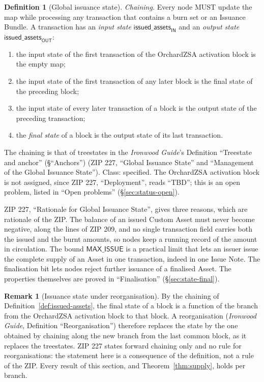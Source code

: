 \documentclass[11pt,a4paper]{article}
\theoremstyle{definition}
\newtheorem{definition}[theorem]{Definition}
\newtheorem{remark}[theorem]{Remark}
\begin{document}
\begin{definition}[Global issuance state]
\emph{Chaining.} Every node MUST update the map while processing any
transaction that contains a burn set or an Issuance Bundle. A transaction has
an \emph{input state} $\mathsf{issued\_assets}_{\mathsf{IN}}$ and an
\emph{output state} $\mathsf{issued\_assets}_{\mathsf{OUT}}$:
\begin{enumerate}
\item the input state of the first transaction of the OrchardZSA activation
  block is the empty map;
\item the input state of the first transaction of any later block is the
  final state of the preceding block;
\item the input state of every later transaction of a block is the output
  state of the preceding transaction;
\item the \emph{final state} of a block is the output state of its last
  transaction.
\end{enumerate}
The chaining is that of treestates in the \emph{Ironwood Guide}'s
Definition ``Treestate and anchor'' (\S``Anchors'') (ZIP 227, ``Global
Issuance State'' and ``Management of the Global Issuance State''). Class:
specified. The OrchardZSA activation block is not assigned, since ZIP 227,
``Deployment'', reads ``TBD''; this is an open problem, listed in ``Open
problems'' (\S\ref{sec:status-open}).
\end{definition}

ZIP 227, ``Rationale for Global Issuance State'', gives three reasons, which
are rationale of the ZIP. The balance of an issued Custom Asset must never
become negative, along the lines of ZIP 209, and no single transaction field
carries both the issued and the burnt amounts, so nodes keep a running record
of the amount in circulation. The bound $\mathsf{MAX\_ISSUE}$ is a practical
limit that lets an issuer issue the complete supply of an Asset in one
transaction, indeed in one Issue Note. The finalisation bit lets nodes reject
further issuance of a finalised Asset. The properties themselves are proved
in ``Finalisation'' (\S\ref{sec:state-final}).

\begin{remark}[Issuance state under reorganisation]\label{rem:reorg-state}
By the chaining of Definition~\ref{def:issued-assets}, the final state of a
block is a function of the branch from the OrchardZSA activation block to
that block. A reorganisation (\emph{Ironwood Guide}, Definition
``Reorganisation'') therefore replaces the state by the one obtained by
chaining along the new branch from the last common block, as it replaces the
treestates. ZIP 227 states forward chaining only and no rule for
reorganisations: the statement here is a consequence of the definition, not
a rule of the ZIP. Every result of this section, and
Theorem~\ref{thm:supply}, holds per branch.
\end{remark}
\end{document}
